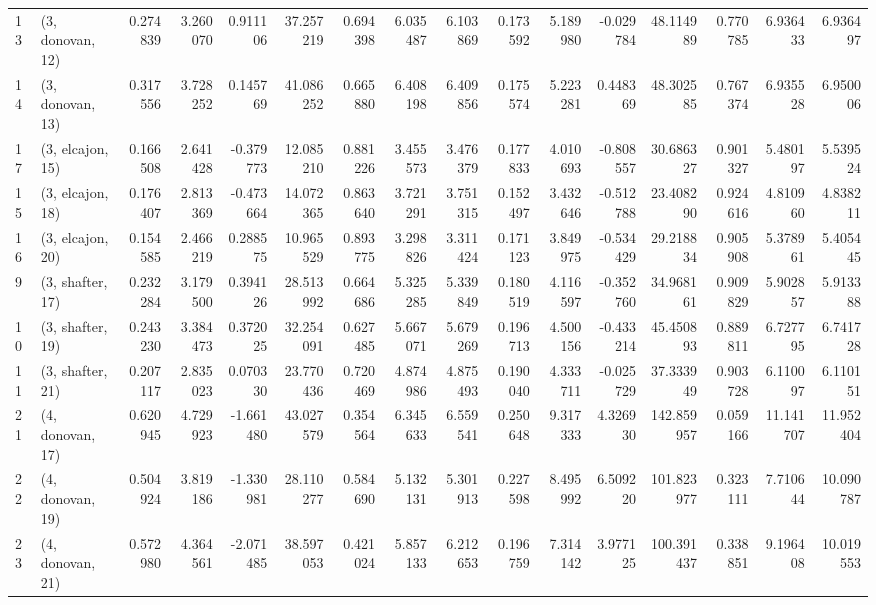 \begin{tabular}{llrrrrrrrrrrrrrr}
13 &  (3, donovan, 12) &   0.274839 &  3.260070 &  0.911106 &  37.257219 &  0.694398 &   6.035487 &  6.103869 &  0.173592 &  5.189980 & -0.029784 &   48.114989 &  0.770785 &   6.936433 &   6.936497 \\
14 &  (3, donovan, 13) &   0.317556 &  3.728252 &  0.145769 &  41.086252 &  0.665880 &   6.408198 &  6.409856 &  0.175574 &  5.223281 &  0.448369 &   48.302585 &  0.767374 &   6.935528 &   6.950006 \\
17 &  (3, elcajon, 15) &   0.166508 &  2.641428 & -0.379773 &  12.085210 &  0.881226 &   3.455573 &  3.476379 &  0.177833 &  4.010693 & -0.808557 &   30.686327 &  0.901327 &   5.480197 &   5.539524 \\
15 &  (3, elcajon, 18) &   0.176407 &  2.813369 & -0.473664 &  14.072365 &  0.863640 &   3.721291 &  3.751315 &  0.152497 &  3.432646 & -0.512788 &   23.408290 &  0.924616 &   4.810960 &   4.838211 \\
16 &  (3, elcajon, 20) &   0.154585 &  2.466219 &  0.288575 &  10.965529 &  0.893775 &   3.298826 &  3.311424 &  0.171123 &  3.849975 & -0.534429 &   29.218834 &  0.905908 &   5.378961 &   5.405445 \\
9  &  (3, shafter, 17) &   0.232284 &  3.179500 &  0.394126 &  28.513992 &  0.664686 &   5.325285 &  5.339849 &  0.180519 &  4.116597 & -0.352760 &   34.968161 &  0.909829 &   5.902857 &   5.913388 \\
10 &  (3, shafter, 19) &   0.243230 &  3.384473 &  0.372025 &  32.254091 &  0.627485 &   5.667071 &  5.679269 &  0.196713 &  4.500156 & -0.433214 &   45.450893 &  0.889811 &   6.727795 &   6.741728 \\
11 &  (3, shafter, 21) &   0.207117 &  2.835023 &  0.070330 &  23.770436 &  0.720469 &   4.874986 &  4.875493 &  0.190040 &  4.333711 & -0.025729 &   37.333949 &  0.903728 &   6.110097 &   6.110151 \\
21 &  (4, donovan, 17) &   0.620945 &  4.729923 & -1.661480 &  43.027579 &  0.354564 &   6.345633 &  6.559541 &  0.250648 &  9.317333 &  4.326930 &  142.859957 &  0.059166 &  11.141707 &  11.952404 \\
22 &  (4, donovan, 19) &   0.504924 &  3.819186 & -1.330981 &  28.110277 &  0.584690 &   5.132131 &  5.301913 &  0.227598 &  8.495992 &  6.509220 &  101.823977 &  0.323111 &   7.710644 &  10.090787 \\
23 &  (4, donovan, 21) &   0.572980 &  4.364561 & -2.071485 &  38.597053 &  0.421024 &   5.857133 &  6.212653 &  0.196759 &  7.314142 &  3.977125 &  100.391437 &  0.338851 &   9.196408 &  10.019553 \\

\end{tabular}
